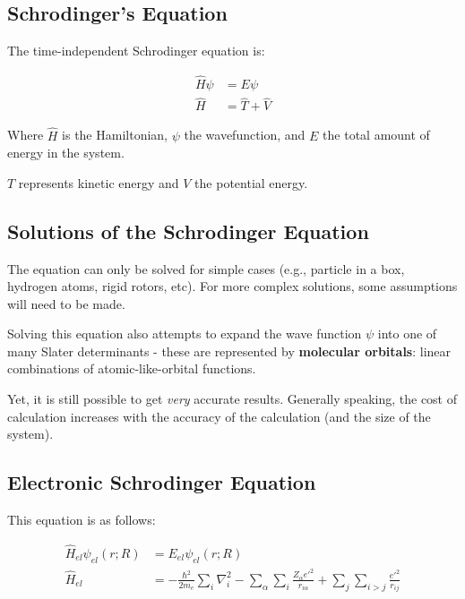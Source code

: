 \documentclass[
  letterpaper,
  DIV=11,
  numbers=noendperiod]{scrreprt}
\begin{document}
\hypertarget{schrodingers-equation}{%
\subsection{Schrodinger's Equation}\label{schrodingers-equation}}

The time-independent Schrodinger equation is:

\begin{align}
  \hat{H}\psi &= E\psi \\ 
  \hat{H} &= \hat{T} + \hat{V}
\end{align}

Where \(\hat{H}\) is the Hamiltonian, \(\psi\) the wavefunction, and
\(E\) the total amount of energy in the system.

\(T\) represents kinetic energy and \(V\) the potential energy.

\hypertarget{solutions-of-the-schrodinger-equation}{%
\subsection{Solutions of the Schrodinger
Equation}\label{solutions-of-the-schrodinger-equation}}

The equation can only be solved for simple cases (e.g., particle in a
box, hydrogen atoms, rigid rotors, etc). For more complex solutions,
some assumptions will need to be made.

Solving this equation also attempts to expand the wave function \(\psi\)
into one of many Slater determinants - these are represented by
\textbf{molecular orbitals}: linear combinations of atomic-like-orbital
functions.

Yet, it is still possible to get \emph{very} accurate results. Generally
speaking, the cost of calculation increases with the accuracy of the
calculation (and the size of the system).

\hypertarget{electronic-schrodinger-equation}{%
\subsection{Electronic Schrodinger
Equation}\label{electronic-schrodinger-equation}}

This equation is as follows:

\begin{align}
  \hat{H}_{el}\psi_{el}(r; R) &=  E_{el}\psi_{el}(r; R) \\ 
  \hat{H}_{el} &= -\frac{\hbar^2}{2m_e}\sum_i\nabla_i^2 - \sum_\alpha\sum_i\frac{Z_\alpha e'^2}{r_{i\alpha}} + \sum_j\sum_{i > j}\frac{e'^2}{r_{ij}}
\end{align}
\end{document}

